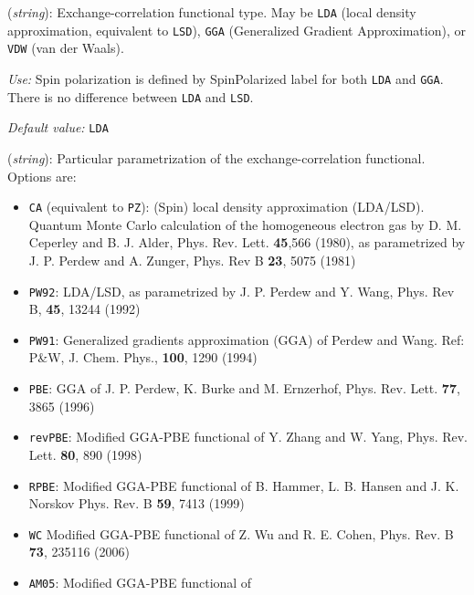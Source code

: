 \begin{description}
\itemsep 10pt
\parsep 0pt


\item[\textbf{XC.functional}] (\textit{string}): 
Exchange-correlation functional type. May be \texttt{LDA} 
(local density approximation, equivalent to \texttt{LSD}),
\texttt{GGA} (Generalized Gradient Approximation), or
\texttt{VDW} (van der Waals).

\textit{Use:} Spin polarization is defined by SpinPolarized label for
both \texttt{LDA} and \texttt{GGA}. There is no difference between \texttt{LDA}
and \texttt{LSD}.

\textit{Default value:} \texttt{LDA}


\item[\textbf{XC.authors}] (\textit{string}):
Particular parametrization of the
exchange-correlation functional. Options are:
\begin{itemize}
\item \texttt{CA} (equivalent to \texttt{PZ}):   
(Spin) local density approximation (LDA/LSD).  
Quantum Monte Carlo calculation of the homogeneous electron gas 
by D. M. Ceperley and B. J. Alder, Phys. Rev. Lett. \textbf{45},566 (1980),
as parametrized by J. P. Perdew and A. Zunger, Phys. Rev B \textbf{23}, 5075 (1981)
\item \texttt{PW92}: 
LDA/LSD, as parametrized by 
J. P. Perdew and Y. Wang, Phys. Rev B, \textbf{45}, 13244 (1992)
\item \texttt{PW91}: 
Generalized gradients approximation (GGA)  of Perdew and Wang. 
Ref: P\&W, J. Chem. Phys., \textbf{100}, 1290 (1994)
\item \texttt{PBE}: 
GGA of J. P. Perdew, K. Burke and M. Ernzerhof, 
Phys. Rev. Lett. \textbf{77}, 3865 (1996) 
\item \texttt{revPBE}: 
Modified GGA-PBE functional of Y. Zhang and W. Yang, 
Phys. Rev. Lett. \textbf{80}, 890 (1998)
\item \texttt{RPBE}: 
Modified GGA-PBE functional of 
B. Hammer, L. B. Hansen and J. K. Norskov Phys. Rev. B \textbf{59}, 7413 (1999)
\item \texttt{WC} 
Modified GGA-PBE functional of 
Z. Wu and R. E. Cohen, Phys. Rev. B \textbf{73}, 235116 (2006)
\item \texttt{AM05}: 
Modified GGA-PBE functional of 

\end{itemize}
\end{description}
